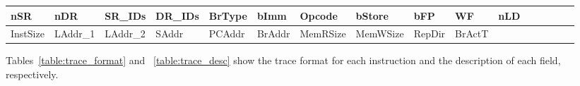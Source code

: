 \ignore
		{
		\begin{table*}[htb]
		\begin{footnotesize}
		\begin{center}
		\caption{MacSim trace format.}
		\label{table:trace_format}
		\begin{tabular}{|l|l|l|l|l|l|l|l|l|l|l|l|l|l|l|l|} 
		\hline
		nSR & nDR & SR\_IDs & DR\_IDs & BrType & bImm & Opcode & bStore & bFP & WF & nLD  \\ \hline \hline
		InstSize & LAddr\_1 & LAddr\_2 & SAddr & PCAddr & BrAddr & MemRSize & MemWSize & RepDir & BrActT & \\ \hline
		\end{tabular}
		\end{center}
		\end{footnotesize}
		\end{table*}

		Tables~\ref{table:trace_format} and ~\ref{table:trace_desc} show the trace
		format for each instruction and the description of each field, respectively.
		}

 
